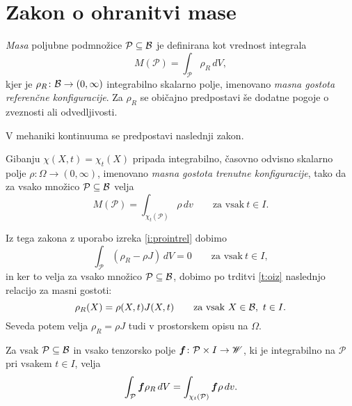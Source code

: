 \section{Zakon o ohranitvi mase}


\emph{Masa} poljubne podmnožice $\mathcal{P}\subseteq \mathcal B$ je definirana kot vrednost integrala
\[ M(\mathcal{P})=\int_{\mathcal{P}}\rho_R\,dV, \]
kjer je $\rho_R\colon \mathcal B\to(0,\infty)$ integrabilno skalarno polje, imenovano
\emph{masna gostota referenčne konfiguracije}.
Za $\rho_R$ se običajno predpostavi še dodatne pogoje o zveznosti ali odvedljivosti.

\begin{comment}
Poljubni konfiguraciji materialnega telesa $\kappa\colon B\to\E$ pripada
integrabilno skalarno polje $\rho_{\kappa}\colon B\to(0,\infty)$, imenovano
\emph{masna gostota konfiguracije $\kappa$}, tako da za vsako množico $P\subseteq B$ velja
\[ M(P)=\int_{\kappa(P)}\rho_{\kappa}\,dv. \]
\end{comment}

V mehaniki kontinuuma se predpostavi naslednji zakon.
\begin{aksiom}
	Gibanju $\chi(X,t)=\chi_t(X)$ pripada integrabilno, časovno odvisno skalarno polje
	$\rho\colon\Omega\to(0,\infty)$, imenovano \emph{masna gostota trenutne konfiguracije},
	tako da za vsako množico $\mathcal{P}\subseteq \mathcal B$ velja
	\[ M(\mathcal{P})=\int_{\chi_t(\mathcal{P})}\rho\,dv\qquad\textrm{za vsak}\ t\in I. \]
\end{aksiom}

Iz tega zakona z uporabo izreka \ref{i:prointrel} dobimo
\[ \int_{\mathcal{P}}(\rho_R-\rho J)\,dV=0 \qquad\textrm{za vsak}\ t\in I, \]
in ker to velja za vsako množico $\mathcal{P}\subseteq \mathcal B$, dobimo po trditvi \ref{t:oiz}
naslednjo relacijo za masni gostoti:
\begin{equation} \label{e:rojror}
	\rho_R(X)=\rho(X,t)J(X,t)\qquad\textrm{za vsak}\ X\in \mathcal B,\ t\in I.
\end{equation}
Seveda potem velja $\rho_R=\rho J$ tudi v prostorskem opisu na $\Omega$.

\begin{posledica} \label{p:roji}
	Za vsak $\mathcal{P}\subseteq \mathcal B$ in vsako
	tenzorsko polje $\boldsymbol f\colon \mathcal{P}\times I\to\mathscr W$, ki je integrabilno na $\mathcal{P}$
	pri vsakem $t\in I$, velja
	\[
		\int_{\mathcal{P}}\boldsymbol f\rho_R\,dV=\int_{\chi_t(\mathcal{P})}\boldsymbol f\rho\,dv.
	\]
\end{posledica}

